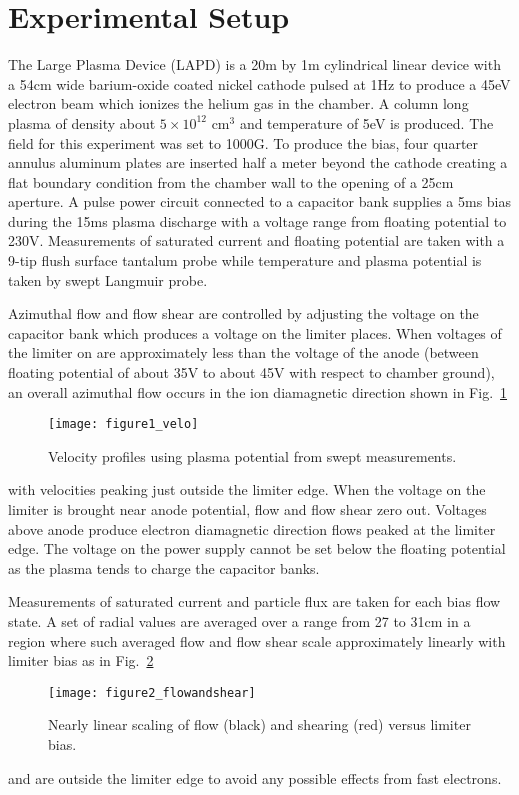\documentclass[%
 aip,
 amsmath,amssymb,
 preprint,%
]{revtex4-1}
\begin{document}
\section{Experimental Setup}

The Large Plasma Device \cite{gek91} (LAPD) is a 20m by 1m cylindrical linear device with a 54cm wide barium-oxide coated nickel cathode pulsed at 1Hz to produce a 45eV electron beam which ionizes the helium gas in the chamber. A column long plasma of density about $5 \times 10^{12}$ cm$^{3}$ and temperature of 5eV is produced. The field for this experiment was set to 1000G. To produce the bias, four quarter annulus aluminum plates are inserted half a meter beyond the cathode creating a flat boundary condition from the chamber wall to the opening of a 25cm aperture. A pulse power circuit connected to a capacitor bank supplies a 5ms bias during the 15ms plasma discharge with a voltage range from floating potential to 230V. Measurements of saturated current and floating potential are taken with a 9-tip flush surface tantalum probe while temperature and plasma potential is taken by swept Langmuir probe.

Azimuthal flow and flow shear are controlled by adjusting the voltage on the capacitor bank which produces a voltage on the limiter places. When voltages of the limiter on are approximately less than the voltage of the anode (between floating potential of about 35V to about 45V with respect to chamber ground), an overall azimuthal flow occurs in the ion diamagnetic direction shown in
Fig.~\ref{fig:velocity}%
\begin{figure}[h]
\texttt{[image: figure1\_velo]}%
\caption{\label{fig:velocity} Velocity profiles using plasma potential from swept measurements.}
\end{figure}
with velocities peaking just outside the limiter edge. When the voltage on the limiter is brought near anode potential, flow and flow shear zero out. Voltages above anode produce electron diamagnetic direction flows peaked at the limiter edge. The voltage on the power supply cannot be set below the floating potential as the plasma tends to charge the capacitor banks.

Measurements of saturated current and particle flux are taken for each bias flow state. A set of radial values are averaged over a range from 27 to 31cm in a region where such averaged flow and flow shear scale approximately linearly with limiter bias as in Fig.~\ref{fig:flowandshear}%
\begin{figure}
\texttt{[image: figure2\_flowandshear]}%
\caption{\label{fig:flowandshear} Nearly linear scaling of flow (black) and shearing (red) versus limiter bias.}
\end{figure}
and are outside the limiter edge to avoid any possible effects from fast electrons.
\end{document}
